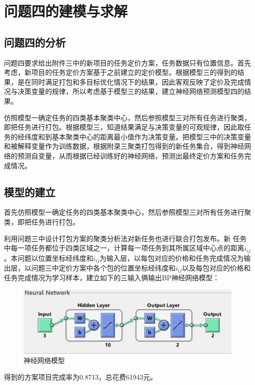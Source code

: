 \documentclass[withoutpreface,bwprint]{cumcmthesis} %
\begin{document}



\section{问题四的建模与求解}
\subsection{问题四的分析}
问题四要求给出附件三中的新项目的任务定价方案，任务数据只有位置信息。首先考虑，新项目的任务定价方案基于之前建立的定价模型。根据模型三的得到的结果，是在同时满足打包和多目标优化情况下的结果，因此客观反映了定价及完成情况与决策变量的规律，所以考虑基于模型三的结果，建立神经网络预测模型四的结果。

仿照模型一确定任务的四类基本聚类中心，然后参照模型三对所有任务进行聚类，即把任务进行打包。根据模型三，知道结果满足与决策变量的可观规律，因此取任务的经纬度和到基本聚类中心的距离最小值作为决策变量。把模型三中的决策变量和被解释变量作为训练数据，根据附录三聚类打包得到的新任务集合，得到神经网络的预测自变量，从而根据已经训练好的神经网络，预测出最终定价方案和任务完成情况。

\subsection{模型的建立}
首先仿照模型一确定任务的四类基本聚类中心，然后参照模型三对所有任务进行聚类，即把任务进行打包。

利用问题三中设计打包方案的聚类分析法对新任务也进行联合打包发布。新
任务中每一项任务都位于四类区域之一，计算每一项任务到其所属区域中心点的距离$i_{ij}$。本问题以位置坐标经纬度和$i_{ij}$为输入层，以每包对应的价格和任务完成情况为输出层，以问题三中定价方案中各个包的位置坐标经纬度和$i_{ij}$以及每包对应的价格和任务完成情况为学习样本，建立如下的三输入俩输出BP神经网络模型：
\begin{figure}[H]
    \centering
    \includegraphics[width=1\textwidth]{3.jpg}
    \caption{神经网络模型}
    \label{图}
\end{figure}
得到的方案项目完成率为0.8713，总花费61943元。
\end{document}
